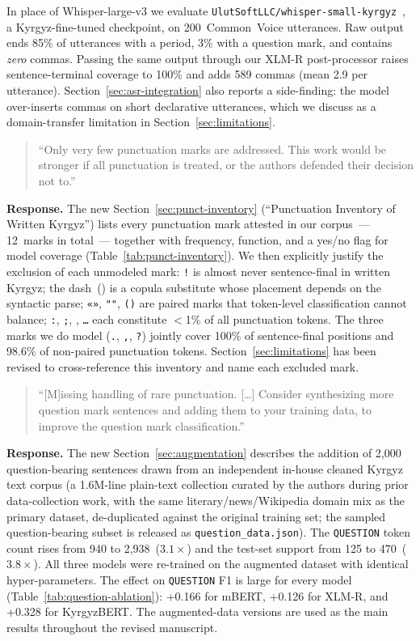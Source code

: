 \documentclass[manuscript, review]{acmart}
\begin{document}
In place of Whisper-large-v3 we evaluate \texttt{UlutSoftLLC/whisper-small-kyrgyz}~\cite{ulutsoft2024whisper}, a Kyrgyz-fine-tuned checkpoint, on 200~Common~Voice utterances. Raw output ends 85\% of utterances with a period, 3\% with a question mark, and contains \emph{zero} commas. Passing the same output through our XLM-R post-processor raises sentence-terminal coverage to 100\% and adds 589 commas (mean 2.9 per utterance). Section~\ref{sec:asr-integration} also reports a side-finding: the model over-inserts commas on short declarative utterances, which we discuss as a domain-transfer limitation in Section~\ref{sec:limitations}.

\begin{quote}
``Only very few punctuation marks are addressed. This work would be stronger if all punctuation is treated, or the authors defended their decision not to.''
\end{quote}

\noindent\textbf{Response.} The new Section~\ref{sec:punct-inventory} (``Punctuation Inventory of Written Kyrgyz'') lists every punctuation mark attested in our corpus~--- 12~marks in total~--- together with frequency, function, and a yes/no flag for model coverage (Table~\ref{tab:punct-inventory}). We then explicitly justify the exclusion of each unmodeled mark: \texttt{!} is almost never sentence-final in written Kyrgyz; the dash~(\textendash) is a copula substitute whose placement depends on the syntactic parse; \texttt{«»}, \texttt{""}, \texttt{()} are paired marks that token-level classification cannot balance; \texttt{:}, \texttt{;}, \texttt{\textemdash}, \texttt{\ldots} each constitute $<$1\% of all punctuation tokens. The three marks we do model (\texttt{.}, \texttt{,}, \texttt{?}) jointly cover 100\% of sentence-final positions and 98.6\% of non-paired punctuation tokens. Section~\ref{sec:limitations} has been revised to cross-reference this inventory and name each excluded mark.

\begin{quote}
``[M]issing handling of rare punctuation. [\ldots] Consider synthesizing more question mark sentences and adding them to your training data, to improve the question mark classification.''
\end{quote}

\noindent\textbf{Response.} The new Section~\ref{sec:augmentation} describes the addition of 2{,}000 question-bearing sentences drawn from an independent in-house cleaned Kyrgyz text corpus (a 1.6M-line plain-text collection curated by the authors during prior data-collection work, with the same literary/news/Wikipedia domain mix as the primary dataset, de-duplicated against the original training set; the sampled question-bearing subset is released as \texttt{question\_data.json}). The \texttt{QUESTION} token count rises from 940 to 2{,}938~($3.1\times$) and the test-set support from 125 to 470~($3.8\times$). All three models were re-trained on the augmented dataset with identical hyper-parameters. The effect on \texttt{QUESTION} F1 is large for every model (Table~\ref{tab:question-ablation}): +0.166 for mBERT, +0.126 for XLM-R, and +0.328 for KyrgyzBERT. The augmented-data versions are used as the main results throughout the revised manuscript.
\end{document}
